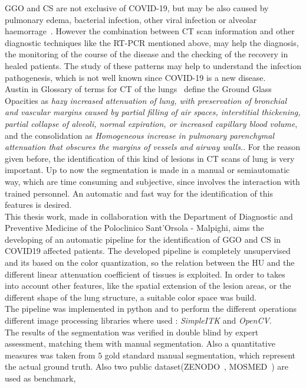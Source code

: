 \documentclass{standalone}
\begin{document}
GGO and CS are not exclusive of COVID-19, but may be also caused by pulmonary edema, bacterial infection, other viral infection or alveolar haemorrage~\cite{ART:Collins}. However the combination between CT scan information and other diagnostic techniques like the RT-PCR mentioned above, may help the diagnosis, the monitoring of the course of the disease and the checking of the recovery in healed patients. The study of these patterns may help to understand the infection pathogenesis, which is not well known since COVID-19 is a new disease.\\
Austin in Glossary of terms for CT of the lungs~\cite{ART:Austin} define the Ground Glass Opacities as \emph{hazy increased attenuation of lung, with preservation of bronchial and vascular margins caused by partial filling of air spaces, interstitial thickening, partial collapse of alveoli, normal expiration, or increased capillary blood volume}, and the consolidation as \textit{Homogeneous increase in pulmonary parenchymal attenuation that obscures the margins of vessels and airway walls.}.
For the reason given before, the identification of this kind of lesions in CT scans of lung is very important. Up to now the segmentation is made in a manual or semiautomatic way, which are time consuming and subjective, since involves the interaction with trained personnel. An automatic and fast way for the identification of this features is desired.\\

This thesis work, made in collaboration with the Department of Diagnostic and Preventive Medicine of the Poloclinico Sant'Orsola - Malpighi, aims the developing of an automatic pipeline for the identification of GGO and CS in COVID19 affected patients. The developed pipeline is completely unsupervised and its based on the color quantization, so the relation between the HU and the different linear attenuation coefficient of tissues is exploited. In order to takes into account other features, like the spatial extension of the lesion areas, or the different shape of the lung structure, a suitable color space was build.\\
The pipeline was implemented in python and to perform the different operations different image processing libraries where used : \emph{SimpleITK} and  \emph{OpenCV}.\\
The results of the segmentation was verified in double blind by expert assessment, matching them with manual segmentation. Also a quantitative measures was taken from $5$ gold standard manual segmentation, which represent the actual ground truth. Also two public dataset(ZENODO~\cite{DATA:ZENODO}, MOSMED~\cite{DATA:MOSMED}) are used as benchmark,
\end{document}
